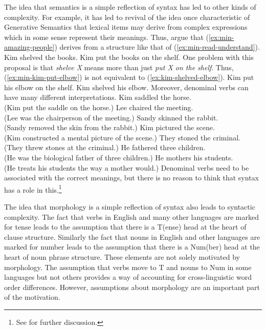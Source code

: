 \documentclass[output=paper]{langsci/langscibook}
\begin{document}
The idea that semantics is a simple reflection of syntax has led to other kinds of complexity. For example, it has led to revival of the idea once characteristic of Generative Semantics that lexical items may derive from complex expressions which in some sense represent their meanings. Thus, \citet{HK93a-u} argue that (\ref{ex:min-amazing-people}) derives from a structure like that of (\ref{ex:min-read-understand}).
\eal
\ex Kim shelved the books.\label{ex:min-kim-shelved}
\ex Kim put the books on the shelf.\label{ex:min-kim-put}
\zl
One problem with this proposal is that \textit{shelve X} means more than just \textit{put X on the shelf}. Thus, (\ref{ex:min-kim-put-elbow}) is not equivalent to (\ref{ex:kim-shelved-elbow}).
\eal 
\ex Kim put his elbow on the shelf.\label{ex:min-kim-put-elbow}
\ex Kim shelved his elbow.\label{ex:kim-shelved-elbow}
\zl 
Moreover, denominal verbs can have many different interpretations.
\eal
\ex Kim saddled the horse.\\
(Kim put the saddle on the horse.)\label{ex:min-kim-saddled}
\ex Lee chaired the meeting.\\
(Lee was the chairperson of the meeting.)\label{ex:min-lee-chaired}
\ex Sandy skinned the rabbit.\\
(Sandy removed the skin from the rabbit.)\label{ex:min-sandy-skinned}
\ex Kim pictured the scene.\\
(Kim constructed a mental picture of the scene.)\label{ex:min-kim-pictured}
\ex They stoned the criminal.\\
(They threw stones at the criminal.)\label{ex:min-they-stoned}
\ex He fathered three children.\\
(He was the biological father of three children.)\label{ex:min-he-fathered}
\ex He mothers his students.\\
(He treats his students the way a mother would.)\label{ex:min-he-mothers}
\zl
Denominal verbs need to be associated with the correct meanings, but there is no reason to think that syntax has a role in this.\footnote{%
See \citet[53--56]{CJ2005a} for further discussion.%
}

The idea that morphology is a simple reflection of syntax also leads to syntactic complexity. The fact that verbs in English and many other languages are marked for tense leads to the assumption that there is a T(ense) head at the heart of clause structure. Similarly the fact that nouns in English and other languages are marked for number leads to the assumption that there is a Num(ber) head at the heart of noun phrase structure. These elements are not solely motivated by morphology. The assumption that verbs move to T and nouns to Num in some languages but not others provides a way of accounting for cross-linguistic word order differences. However, assumptions about morphology are an important part of the motivation.
\end{document}
